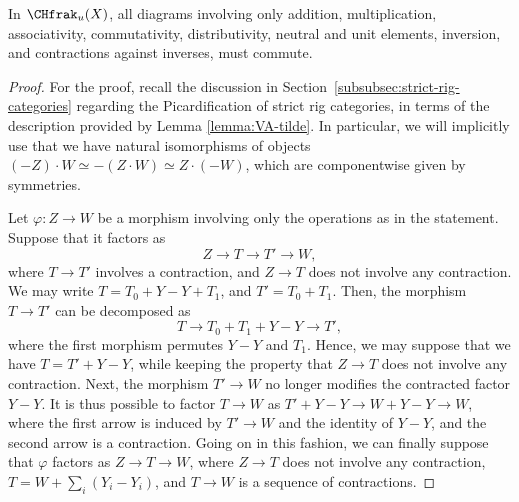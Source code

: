 \begin{corollary}\label{cor:coherence}
In $\CHfrak_{u}(X)$, all diagrams involving only addition, multiplication, associativity, commutativity, distributivity, neutral and unit elements, inversion, and contractions against inverses, must commute.
\end{corollary}
\begin{proof}

For the proof, recall the discussion in Section~\ref{subsubsec:strict-rig-categories} regarding the Picardification of strict rig categories, in terms of the description provided by Lemma \ref{lemma:VA-tilde}. In particular, we will implicitly use that we have natural isomorphisms of objects $(-Z)\cdot W\simeq -(Z\cdot W)\simeq Z\cdot (-W)$, which are componentwise given by symmetries.

Let $\varphi\colon Z\to W$ be a morphism involving only the operations as in the statement. Suppose that it factors as
\begin{displaymath}
Z\to T\to T'\to W,
\end{displaymath}
where $T\to T'$ involves a contraction, and $Z\to T$ does not involve any contraction. We may write $T=T_{0}+Y-Y+T_{1}$, and $T'=T_{0}+T_{1}$. Then, the morphism $T\to T'$ can be decomposed as
\begin{displaymath}
T\to T_{0}+T_{1}+Y-Y\to T',
\end{displaymath}
where the first morphism permutes $Y-Y$ and $T_{1}$. Hence, we may suppose that we have $T=T'+Y-Y$, while keeping the property that $Z\to T$ does not involve any contraction. Next, the morphism $T'\to W$ no longer modifies the contracted factor $Y-Y$. It is thus possible to factor $T\to W$ as $T'+Y-Y\to W+Y-Y\to W$, where the first arrow is induced by $T'\to W$ and the identity of $Y-Y$, and the second arrow is a contraction. Going on in this fashion, we can finally suppose that $\varphi$ factors as $Z\to T\to W$, where $Z\to T$ does not involve any contraction, $T=W+\sum_{i}(Y_{i}-Y_{i})$, and $T\to W$ is a sequence of contractions.


\end{proof}
